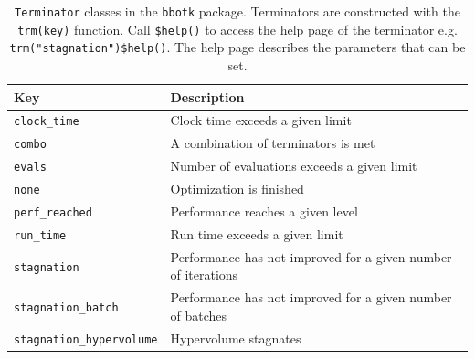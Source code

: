 \begin{table}[H]
  \centering
  \caption{\texttt{Terminator} classes in the \texttt{bbotk} package. 
  Terminators are constructed with the \texttt{trm(key)} function.
  Call \texttt{\$help()} to access the help page of the terminator e.g. \texttt{trm("stagnation")\$help()}.
  The help page describes the parameters that can be set.} 
  \label{tab:terminators}
  \begin{tabular}{ll}
    \toprule
    Key                     & Description                                                    \\
    \midrule
    \texttt{clock\_time}             & Clock time exceeds a given limit                              \\
    \texttt{combo}                   & A combination of terminators is met                           \\
    \texttt{evals}                   & Number of evaluations exceeds a given limit                   \\
    \texttt{none}                    & Optimization is finished                                      \\
    \texttt{perf\_reached}           & Performance reaches a given level                             \\
    \texttt{run\_time}               & Run time exceeds a given limit                                \\
    \texttt{stagnation}              & Performance has not improved for a given number of iterations \\
    \texttt{stagnation\_batch}       & Performance has not improved for a given number of batches    \\
    \texttt{stagnation\_hypervolume} & Hypervolume stagnates                                         \\
    \bottomrule
  \end{tabular}
\end{table}
